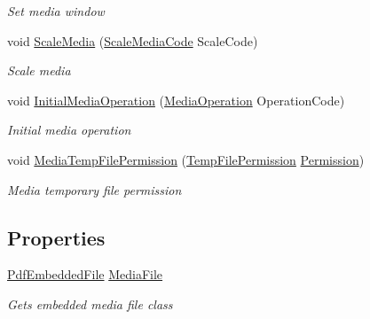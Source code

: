 \begin{DoxyCompactItemize}
\begin{DoxyCompactList}\small\item\em Set media window \end{DoxyCompactList}\item 
void \hyperlink{class_pdf_file_writer_1_1_pdf_display_media_a820b38c20e7d5d8dd6494397d8d14e22}{Scale\+Media} (\hyperlink{namespace_pdf_file_writer_a4f8011b57966a21a365eeaa2469a5dab}{Scale\+Media\+Code} Scale\+Code)
\begin{DoxyCompactList}\small\item\em Scale media \end{DoxyCompactList}\item 
void \hyperlink{class_pdf_file_writer_1_1_pdf_display_media_aa9532671f0a12aa9998e9e326e8aac11}{Initial\+Media\+Operation} (\hyperlink{namespace_pdf_file_writer_a584857a04ad87432dfae4edfe22a8dce}{Media\+Operation} Operation\+Code)
\begin{DoxyCompactList}\small\item\em Initial media operation \end{DoxyCompactList}\item 
void \hyperlink{class_pdf_file_writer_1_1_pdf_display_media_a0acee3ec5dda1e30dd0dc7b2825fca96}{Media\+Temp\+File\+Permission} (\hyperlink{namespace_pdf_file_writer_a7714a72b0a64df6288ea710b8092d8bb}{Temp\+File\+Permission} \hyperlink{namespace_pdf_file_writer_a10f216f5352bb45a6ed502a96ccdf5d7}{Permission})
\begin{DoxyCompactList}\small\item\em Media temporary file permission \end{DoxyCompactList}\end{DoxyCompactItemize}
\subsection*{Properties}
\begin{DoxyCompactItemize}
\item 
\hyperlink{class_pdf_file_writer_1_1_pdf_embedded_file}{Pdf\+Embedded\+File} \hyperlink{class_pdf_file_writer_1_1_pdf_display_media_add8c8947af649debff781cbc6625eb7c}{Media\+File}
\begin{DoxyCompactList}\small\item\em Gets embedded media file class \end{DoxyCompactList}\end{DoxyCompactItemize}


